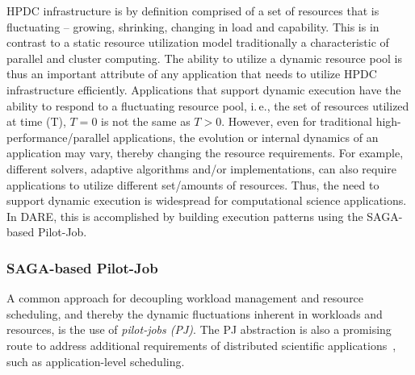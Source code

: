 \documentclass[]{svjour3}
\begin{document}
HPDC infrastructure is by definition comprised of a set of resources
that is fluctuating -- growing, shrinking, changing in load and
capability. This is in contrast to a static resource utilization model
traditionally a characteristic of parallel and cluster computing. The
ability to utilize a dynamic resource pool is thus an important
attribute of any application that needs to utilize HPDC infrastructure
efficiently. Applications that support dynamic execution have the
ability to respond to a fluctuating resource pool, i.\,e., the set of
resources utilized at time (T), $T=0$ is not the same as $T>0$.
However, even for traditional high-performance/parallel applications,
the evolution or internal dynamics of an application may vary, thereby
changing the resource requirements. For example, different solvers,
adaptive algorithms and/or implementations, can also require
applications to utilize different set/amounts of resources. Thus, the
need to support dynamic execution is widespread for computational
science applications. In DARE, this is accomplished by building execution
patterns using the SAGA-based Pilot-Job.


\subsubsection{SAGA-based Pilot-Job}

A common approach for decoupling workload management and resource
scheduling, and thereby the dynamic fluctuations inherent in workloads
and resources, is the use of \emph{pilot-jobs (PJ)}. The PJ abstraction is also a
promising route to address additional requirements of distributed scientific
applications~\cite{ko-efficient,bigjob_cloudcom10}, such as application-level scheduling.
 
\end{document}
